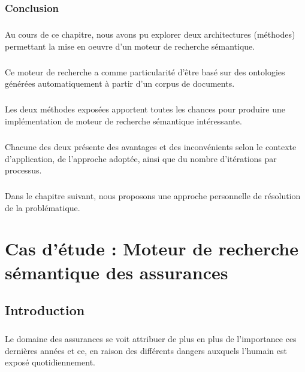 \documentclass[12pt, a4paper, oneside]{book}
\begin{document}
\subsection{Conclusion}
\paragraph{}
Au cours de ce chapitre, nous avons pu explorer deux architectures (méthodes) permettant la mise en oeuvre d'un moteur de recherche sémantique.
\paragraph{}
Ce moteur de recherche a comme particularité d'être basé sur des ontologies générées automatiquement à partir d'un corpus de documents.
\paragraph{}
Les deux méthodes exposées apportent toutes les chances pour produire une implémentation de moteur de recherche sémantique intéressante.
\paragraph{}
Chacune des deux présente des avantages et des inconvénients selon le contexte d'application, de l'approche adoptée, ainsi que du nombre d'itérations par processus.
\paragraph{}
Dans le chapitre suivant, nous proposons une approche personnelle de résolution de la problématique.


\chapter{Cas d'étude : Moteur de recherche sémantique des assurances}

\section{Introduction}

\paragraph{}
Le domaine des assurances se voit attribuer de plus en plus de l'importance ces dernières années et ce, en raison des différents dangers auxquels l'humain est exposé quotidiennement.
\end{document}
